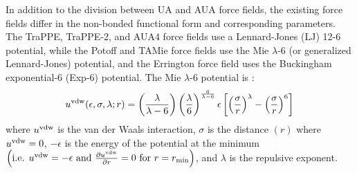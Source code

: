 \documentclass[preprint,letterpaper,floatfix,citeautoscript,aip,jcp]{revtex4-1}
\begin{document}
%
%

%

In addition to the 
division between
UA and AUA force fields, the existing force fields differ in the non-bonded functional form and corresponding parameters. The TraPPE, TraPPE-2, and AUA4 force fields use a Lennard-Jones (LJ) 12-6 potential, while the Potoff and TAMie force fields use the Mie $\lambda$-6 (or generalized Lennard-Jones) potential, and the Errington force field uses the Buckingham exponential-6 (Exp-6) potential. 
The Mie $\lambda$-6 potential is \cite{Herdes2015}:
\begin{equation} \label{eq:Mie}
u^{\rm vdw}(\epsilon,\sigma,\lambda;r) = \left(\frac{\lambda}{\lambda - 6}\right)\left(\frac{\lambda}{6}\right)^{\frac{6}{\lambda - 6}} \epsilon \left[\left(\frac{\sigma}{r}\right)^\lambda - \left(\frac{\sigma}{r}\right)^6\right]
\end{equation} 
where $u^{\rm vdw}$ is the van der Waals interaction, $\sigma$ is the distance $(r)$ where $u^{\rm vdw} = 0$, $-\epsilon$ is the energy of the potential at the minimum $\left(\text{i.e. }u^{\rm vdw} = -\epsilon \text{ and } \frac{\partial u^{\rm vdw}}{\partial r} = 0 \text{ for } r=r_{\rm min} \right)$, and $\lambda$ is the repulsive exponent. 
\end{document}
